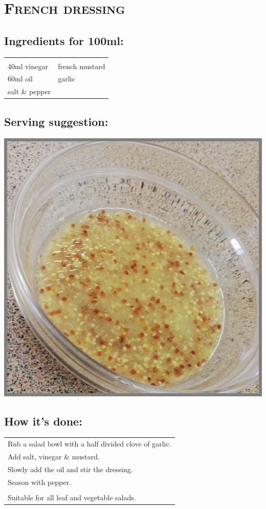 \section{\textsc{French dressing}}

\subsection*{Ingredients for 100ml:}

\begin{tabular}{p{7.5cm} p{7.5cm}}
	& \\
	40ml vinegar & french mustard \\
	60ml oil & garlic \\
	salt \& pepper &
\end{tabular}

\subsection*{Serving suggestion:}

\includegraphics[width=\textwidth]{img/d_french.jpeg} \cite{dfrench}

\subsection*{How it's done:}

\begin{tabular}{p{15cm}}
	\\
	Rub a salad bowl with a half divided clove of garlic.\\
	Add salt, vinegar \& mustard.\\
	Slowly add the oil and stir the dressing.\\
	Season with pepper.\\
	\\
	Suitable for all leaf and vegetable salads.
\end{tabular}
